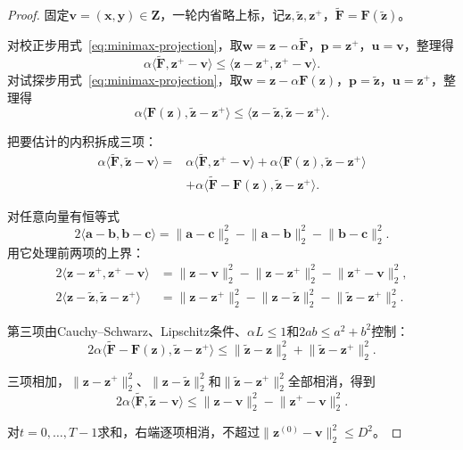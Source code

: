 \begin{proof}
固定$\bm{v}=(\bm{x},\bm{y})\in\bm{Z}$，一轮内省略上标，记$\bm{z},\tilde{\bm{z}},\bm{z}^{+}$，$\tilde{\bm{F}}=\bm{F}(\tilde{\bm{z}})$。

对校正步用式~\eqref{eq:minimax-projection}，取$\bm{w}=\bm{z}-\alpha\tilde{\bm{F}}$，$\bm{p}=\bm{z}^{+}$，$\bm{u}=\bm{v}$，整理得
\[
 \alpha\langle\tilde{\bm{F}},\bm{z}^{+}-\bm{v}\rangle\leq\langle\bm{z}-\bm{z}^{+},\bm{z}^{+}-\bm{v}\rangle.
\]
对试探步用式~\eqref{eq:minimax-projection}，取$\bm{w}=\bm{z}-\alpha\bm{F}(\bm{z})$，$\bm{p}=\tilde{\bm{z}}$，$\bm{u}=\bm{z}^{+}$，整理得
\[
 \alpha\langle\bm{F}(\bm{z}),\tilde{\bm{z}}-\bm{z}^{+}\rangle\leq\langle\bm{z}-\tilde{\bm{z}},\tilde{\bm{z}}-\bm{z}^{+}\rangle.
\]

把要估计的内积拆成三项：
\[
 \begin{aligned}
 \alpha\langle\tilde{\bm{F}},\tilde{\bm{z}}-\bm{v}\rangle
 ={}&\alpha\langle\tilde{\bm{F}},\bm{z}^{+}-\bm{v}\rangle+\alpha\langle\bm{F}(\bm{z}),\tilde{\bm{z}}-\bm{z}^{+}\rangle\\
 &+\alpha\langle\tilde{\bm{F}}-\bm{F}(\bm{z}),\tilde{\bm{z}}-\bm{z}^{+}\rangle.
 \end{aligned}
\]

对任意向量有恒等式
\[
 2\langle\bm{a}-\bm{b},\bm{b}-\bm{c}\rangle=\lVert\bm{a}-\bm{c}\rVert_2^2-\lVert\bm{a}-\bm{b}\rVert_2^2-\lVert\bm{b}-\bm{c}\rVert_2^2.
\]
用它处理前两项的上界：
\[
 \begin{aligned}
 2\langle\bm{z}-\bm{z}^{+},\bm{z}^{+}-\bm{v}\rangle&=\lVert\bm{z}-\bm{v}\rVert_2^2-\lVert\bm{z}-\bm{z}^{+}\rVert_2^2-\lVert\bm{z}^{+}-\bm{v}\rVert_2^2,\\
 2\langle\bm{z}-\tilde{\bm{z}},\tilde{\bm{z}}-\bm{z}^{+}\rangle&=\lVert\bm{z}-\bm{z}^{+}\rVert_2^2-\lVert\bm{z}-\tilde{\bm{z}}\rVert_2^2-\lVert\tilde{\bm{z}}-\bm{z}^{+}\rVert_2^2.
 \end{aligned}
\]

第三项由Cauchy--Schwarz、Lipschitz条件、$\alpha L\leq1$和$2ab\leq a^2+b^2$控制：
\[
 2\alpha\langle\tilde{\bm{F}}-\bm{F}(\bm{z}),\tilde{\bm{z}}-\bm{z}^{+}\rangle\leq\lVert\tilde{\bm{z}}-\bm{z}\rVert_2^2+\lVert\tilde{\bm{z}}-\bm{z}^{+}\rVert_2^2.
\]

三项相加，$\lVert\bm{z}-\bm{z}^{+}\rVert_2^2$、$\lVert\bm{z}-\tilde{\bm{z}}\rVert_2^2$和$\lVert\tilde{\bm{z}}-\bm{z}^{+}\rVert_2^2$全部相消，得到
\[
 2\alpha\langle\tilde{\bm{F}},\tilde{\bm{z}}-\bm{v}\rangle\leq\lVert\bm{z}-\bm{v}\rVert_2^2-\lVert\bm{z}^{+}-\bm{v}\rVert_2^2.
\]

对$t=0,\ldots,T-1$求和，右端逐项相消，不超过$\lVert\bm{z}^{(0)}-\bm{v}\rVert_2^2\leq D^2$。


\end{proof}
